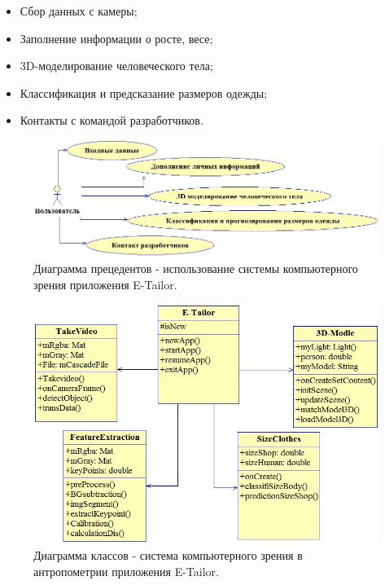 \begin{itemize}
	\item Сбор данных с камеры;
	\item Заполнение информации о росте, весе;
	\item 3D-моделирование человеческого тела;
	\item Классификация и предсказание размеров одежды;
	\item Контакты с командой разработчиков.

\end{itemize}
\begin{figure}[ht!]
\centering
\includegraphics [scale=0.5] {images/h22.png}
\begin{center}
\caption{Диаграмма прецедентов - использование системы компьютерного зрения приложения E-Tailor.} \label{img22}
\end{center}
\end{figure}
\begin{figure}[ht!]
\centering
\includegraphics [scale=0.5] {images/h23.png}
\begin{center}
\caption{Диаграмма классов - система компьютерного зрения в антропометрии приложения E-Tailor.} \label{img23}
\end{center}
\end{figure}
